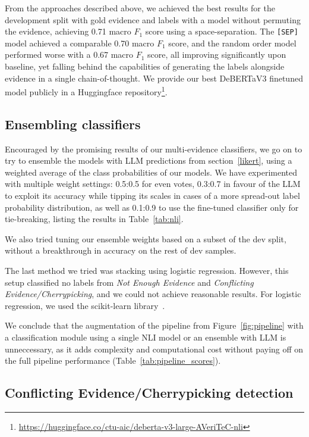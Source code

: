 From the approaches described above, we achieved the best results for the development split with gold evidence and labels with a model without permuting the evidence, achieving 0.71 macro $F_1$ score using a space-separation. The \texttt{[SEP]} model achieved a comparable 0.70 macro $F_1$ score, and the random order model performed worse with a 0.67 macro $F_1$ score, all improving significantly upon baseline, yet falling behind the capabilities of generating the labels alongside evidence in a single chain-of-thought. 
We provide our best DeBERTaV3 finetuned model publicly in a Huggingface repository\footnote{\url{https://huggingface.co/ctu-aic/deberta-v3-large-AVeriTeC-nli}}.

\subsection{Ensembling classifiers}
\label{subsubsec:ensembling}

Encouraged by the promising results of our multi-evidence classifiers, we go on to try to ensemble the models with LLM predictions from section~\ref{likert}, using a weighted average of the class probabilities of our models.
We have experimented with multiple weight settings: 0.5:0.5 for even votes, 0.3:0.7 in favour of the LLM to exploit its accuracy while tipping its scales in cases of a more spread-out label probability distribution, as well as 0.1:0.9 to use the fine-tuned classifier only for tie-breaking, listing the results in Table~\ref{tab:nli}.

We also tried tuning our ensemble weights based on a subset of the dev split, without a breakthrough in accuracy on the rest of dev samples.

The last method we tried was stacking using logistic regression. However, this setup classified no labels from \textit{Not Enough Evidence} and \textit{Conflicting Evidence/Cherrypicking}, and we could not achieve reasonable results. For logistic regression, we used the scikit-learn library~\cite{scikit-learn}.

We conclude that the augmentation of the pipeline from Figure~\ref{fig:pipeline} with a classification module using a single NLI model or an ensemble with LLM is unneccessary, as it adds complexity and computational cost without paying off on the full pipeline performance (Table~\ref{tab:pipeline_scores}).

\subsection{Conflicting Evidence/Cherrypicking detection}

